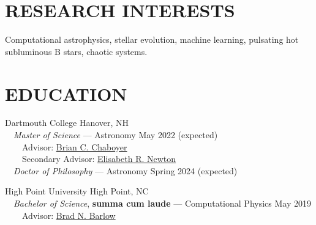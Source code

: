 \documentclass[margin, 10pt]{res} %
\begin{document}
\begin{resume}

 
\section{RESEARCH INTERESTS}  
Computational astrophysics, stellar evolution, machine learning, pulsating hot subluminous B stars, chaotic systems.
 

\section{EDUCATION}
{\large Dartmouth College} \hfill Hanover, NH\\
{\-\ \-\ \small \textit{Master of Science} --- Astronomy} \hfill May 2022 (expected)\\
{\-\ \-\ \-\ \-\ \small Advisor: \href{https://physics.dartmouth.edu/people/brian-charles-chaboyer}{Brian C. Chaboyer}} \\
{\-\ \-\ \-\ \-\ \small Secondary Advisor: \href{https://physics.dartmouth.edu/people/elisabeth-newton}{Elisabeth R. Newton}} \\
{\-\ \-\ \small \textit{Doctor of Philosophy} –-- Astronomy} \hfill Spring 2024 (expected)

{\large High Point University} \hfill High Point, NC\\
{\-\ \-\ \small \textit{Bachelor of Science}, \textbf{summa cum laude} --- Computational Physics} \hfill May 2019\\
{\-\ \-\ \-\ \-\ \small Advisor: \href{http://linus.highpoint.edu/~bbarlow/}{Brad N. Barlow}} \\


\end{resume}
\end{document}
